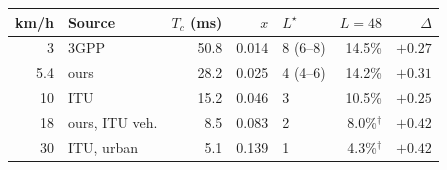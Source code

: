 \begin{tabular}{rlrrlrr}
\toprule
km/h & Source & $T_c$ (ms) & $x$ & $L^\star$ & $L{=}48$ & $\Delta$ \\
\midrule
3 & 3GPP~\cite{3gpp_tr38913} & 50.8 & 0.014 & 8 (6--8) & 14.5\% & $+0.27$ \\
5.4 & ours & 28.2 & 0.025 & 4 (4--6) & 14.2\% & $+0.31$ \\
10 & ITU~\cite{itu_m2410} & 15.2 & 0.046 & 3 & 10.5\% & $+0.25$ \\
18 & ours, ITU veh. & 8.5 & 0.083 & 2 & 8.0\%$^\dagger$ & $+0.42$ \\
30 & ITU, urban & 5.1 & 0.139 & 1 & 4.3\%$^\dagger$ & $+0.42$ \\
\bottomrule
\end{tabular}
